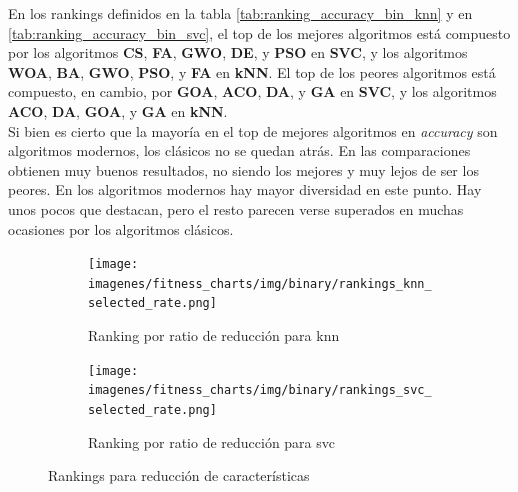 En los rankings definidos en la tabla \ref{tab:ranking_accuracy_bin_knn} y en \ref{tab:ranking_accuracy_bin_svc}, el top de los mejores algoritmos está compuesto por los algoritmos \textbf{CS}, \textbf{FA}, \textbf{GWO}, \textbf{DE}, y \textbf{PSO} en \textbf{SVC}, y los algoritmos \textbf{WOA}, \textbf{BA}, \textbf{GWO}, \textbf{PSO}, y \textbf{FA} en \textbf{kNN}. El top de los peores algoritmos está compuesto, en cambio, por \textbf{GOA}, \textbf{ACO}, \textbf{DA}, y \textbf{GA} en \textbf{SVC}, y los algoritmos \textbf{ACO}, \textbf{DA}, \textbf{GOA}, y \textbf{GA} en \textbf{kNN}.\\[6pt]

Si bien es cierto que la mayoría en el top de mejores algoritmos en \textit{accuracy} son algoritmos modernos, los clásicos no se quedan atrás. En las comparaciones obtienen muy buenos resultados, no siendo los mejores y muy lejos de ser los peores. En los algoritmos modernos hay mayor diversidad en este punto. Hay unos pocos que destacan, pero el resto parecen verse superados en muchas ocasiones por los algoritmos clásicos.\\[6pt]

\begin{figure}[htp]
    \centering
    \begin{subfigure}[htp]{1\textwidth}
        \texttt{[image: imagenes/fitness\_charts/img/binary/rankings\_knn\_selected\_rate.png]}
        \caption{Ranking por ratio de reducción para knn}
        \label{fig:ranking_knn_red}
    \end{subfigure}
    \begin{subfigure}[htp]{1\textwidth}
        \texttt{[image: imagenes/fitness\_charts/img/binary/rankings\_svc\_selected\_rate.png]}
        \caption{Ranking por ratio de reducción para svc}
        \label{fig:ranking_svc_red}
    \end{subfigure}
    \caption{Rankings para reducción de características}
    \label{fig:rankings_red_bin}
\end{figure}

